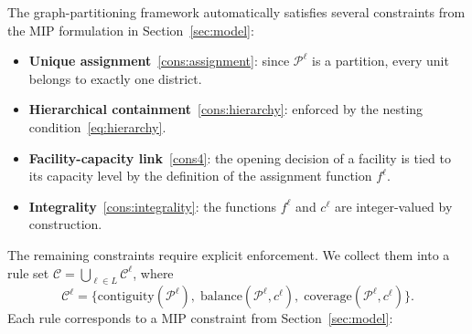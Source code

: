 \documentclass[preprint,12pt,authoryear]{elsarticle}
\theoremstyle{definition}
\begin{document}
The graph-partitioning framework automatically satisfies several constraints
from the MIP formulation in Section~\ref{sec:model}:
\medskip
%
\begin{itemize}[nosep]
  \item \textbf{Unique assignment}~\eqref{cons:assignment}: since
    $\mathcal{P}^\ell$ is a partition, every unit belongs to exactly one
    district.
  \item \textbf{Hierarchical containment}~\eqref{cons:hierarchy}: enforced by
    the nesting condition~\eqref{eq:hierarchy}.
  \item \textbf{Facility-capacity link}~\eqref{cons4}: the opening decision of a facility is tied to its capacity level by the definition of the assignment function $f^{\ell}$.
  \item \textbf{Integrality}~\eqref{cons:integrality}: the functions $f^\ell$
    and $c^\ell$ are integer-valued by construction.
\end{itemize}
\medskip
The remaining constraints require explicit enforcement. We collect them into a
rule set $\mathcal{C} = \bigcup_{\ell \in L} \mathcal{C}^\ell$, where
%
\begin{equation}\label{eq:rules}
    \mathcal{C}^\ell = \bigl\{
        \mathrm{contiguity}(\mathcal{P}^\ell),\;
        \mathrm{balance}(\mathcal{P}^\ell, c^\ell),\;
        \mathrm{coverage}(\mathcal{P}^\ell, c^\ell)
    \bigr\}.
\end{equation}
%
Each rule corresponds to a MIP constraint from Section~\ref{sec:model}:
\end{document}
